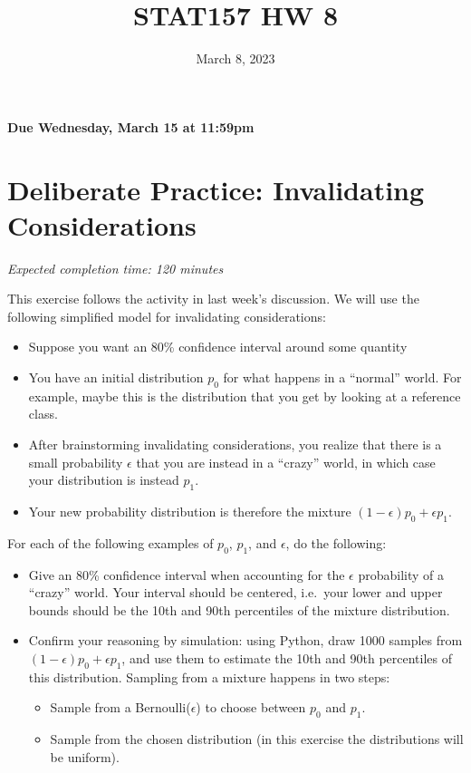 \documentclass[11pt]{article}
\title{STAT157 HW 8}
\date{March 8, 2023}
\begin{document}
\maketitle

\hfill \textbf{Due Wednesday, March 15 at 11:59pm}

\section*{Deliberate Practice: Invalidating Considerations}

\emph{Expected completion time: 120 minutes}

This exercise follows the activity in last week's discussion.
We will use the following simplified model for invalidating considerations:
\begin{itemize}
	\item Suppose you want an 80\% confidence interval around some quantity
	\item You have an initial distribution $p_0$ for what happens in a “normal” world. For example, maybe this is the distribution that you get by looking at a reference class.
	\item After brainstorming invalidating considerations, you realize that there is a small probability $\epsilon$ that you are instead in a “crazy” world, in which case your distribution is instead $p_1$.
	\item Your new probability distribution is therefore the mixture $(1 - \epsilon) p_0 + \epsilon p_1$.
\end{itemize}

For each of the following examples of $p_0$, $p_1$, and $\epsilon$, do the following:
\begin{itemize}
	\item Give an 80\% confidence interval when accounting for the $\epsilon$ probability of a ``crazy'' world. Your interval should be centered, i.e.~your lower and upper bounds should be the 10th and 90th percentiles of the mixture distribution.
	\item Confirm your reasoning by simulation: using Python, draw 1000 samples from $(1 - \epsilon) p_0 + \epsilon p_1$, and use them to estimate the 10th and 90th percentiles of this distribution. Sampling from a mixture happens in two steps:
		\begin{itemize}
			\item Sample from a Bernoulli($\epsilon$) to choose between $p_0$ and $p_1$.
			\item Sample from the chosen distribution (in this exercise the distributions will be uniform).
		\end{itemize}
\end{itemize}
\end{document}
